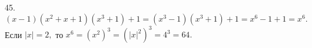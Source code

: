45. $(x-1)(x^2+x+1)(x^3+1)+1=(x^3-1)(x^3+1)+1=x^6-1+1=x^6.$ Если $|x|=2,$ то $x^6=(x^2)^3=(|x|^2)^3=4^3=64.$\\
